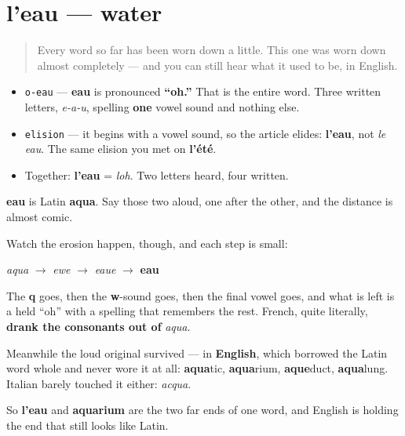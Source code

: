 \section[l'eau]{l'eau — water}

\label{lesson:FR-C11-eau}



\begin{quote}
Every word so far has been worn down a little. This one was worn down almost completely — and you can still hear what it used to be, in English.
\end{quote}

\begin{sounds}
\begin{itemize}
\raggedright
  \item \texttt{o-eau} — \textbf{eau} is pronounced \textbf{\textquotedblleft{}oh.\textquotedblright{}} That is the entire word. Three written letters, \emph{e-a-u}, spelling \textbf{one} vowel sound and nothing else.
  \item \texttt{elision} — it begins with a vowel sound, so the article elides: \textbf{l'eau}, not \emph{le eau}. The same elision you met on \textbf{l'été}.
  \item Together: \textbf{l'eau} = \emph{loh}. Two letters heard, four written.
\end{itemize}
\end{sounds}

\begin{cousinweb}
\textbf{eau} is Latin \textbf{aqua}. Say those two aloud, one after the other, and the distance is almost comic.

Watch the erosion happen, though, and each step is small:

\emph{aqua} $\to$ \emph{ewe} $\to$ \emph{eaue} $\to$ \textbf{eau}

The \textbf{q} goes, then the \textbf{w}-sound goes, then the final vowel goes, and what is left is a held \textquotedblleft{}oh\textquotedblright{} with a spelling that remembers the rest. French, quite literally, \textbf{drank the consonants out of} \emph{aqua}.

Meanwhile the loud original survived — in \textbf{English}, which borrowed the Latin word whole and never wore it at all: \textbf{aqua}tic, \textbf{aqua}rium, \textbf{aque}duct, \textbf{aqua}lung. Italian barely touched it either: \emph{acqua}.

So \textbf{l'eau} and \textbf{aquarium} are the two far ends of one word, and English is holding the end that still looks like Latin.
\end{cousinweb}


